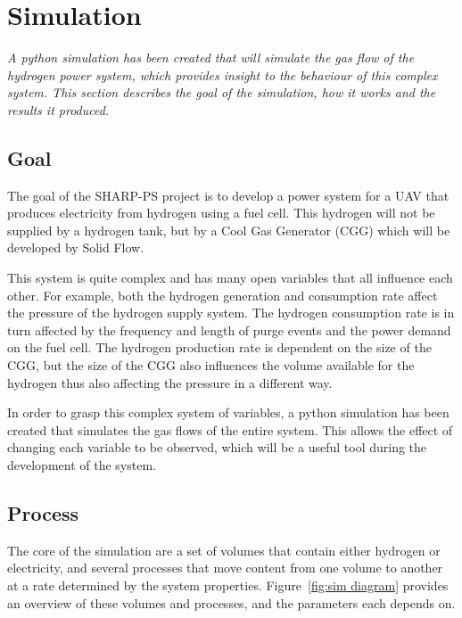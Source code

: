 \section{Simulation}%
\label{sec:simulation}
\emph{A python simulation has been created that will simulate the gas flow of the hydrogen power system, which provides insight to the behaviour of this complex system. This section describes the goal of the simulation, how it works and the results it produced.}

\subsection{Goal}
The goal of the SHARP-PS project is to develop a power system for a UAV that produces electricity from hydrogen using a fuel cell. This hydrogen will not be supplied by a hydrogen tank, but by a Cool Gas Generator (CGG) which will be developed by Solid Flow.

This system is quite complex and has many open variables that all influence each other.
For example, both the hydrogen generation and consumption rate affect the pressure of the hydrogen supply system. The hydrogen consumption rate is in turn affected by the frequency and length of purge events and the power demand on the fuel cell. The hydrogen production rate is dependent on the size of the CGG, but the size of the CGG also influences the volume available for the hydrogen thus also affecting the pressure in a different way.

In order to grasp this complex system of variables, a python simulation has been created that simulates the gas flows of the entire system. This allows the effect of changing each variable to be observed, which will be a useful tool during the development of the system.

\subsection{Process}
The core of the simulation are a set of volumes that contain either hydrogen or electricity, and several processes that move content from one volume to another at a rate determined by the system properties. Figure~\ref{fig:sim diagram} provides an overview of these volumes and processes, and the parameters each depends on.

\newcommand{\pytable}[2]{
    \begin{tabular}{c}
        \textbf{#1} \\
        \midrule
        #2          \\
    \end{tabular}
}

